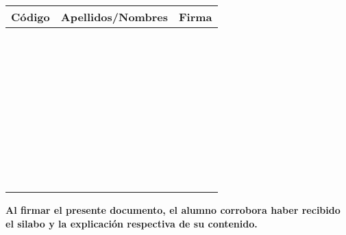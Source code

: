 \documentclass[final]{article}
\begin{document}
\begin{center}
\begin{tabularx}{\textwidth}{|p{2.5cm}|X|p{2.5cm}|}      \hline
{\bf Código} & {\bf Apellidos/Nombres} & {\bf Firma} \\ \hline
 & & \\ \hline
 & & \\ \hline
 & & \\ \hline
 & & \\ \hline
 & & \\ \hline
 & & \\ \hline
 & & \\ \hline
 & & \\ \hline
 & & \\ \hline
 & & \\ \hline
 & & \\ \hline
 & & \\ \hline
 & & \\ \hline
 & & \\ \hline
 & & \\ \hline
 & & \\ \hline
 & & \\ \hline
 & & \\ \hline
 & & \\ \hline
 & & \\ \hline
 & & \\ \hline
 & & \\ \hline
 & & \\ \hline
 & & \\ \hline
 & & \\ \hline
 & & \\ \hline
 & & \\ \hline
 & & \\ \hline
 & & \\ \hline
 & & \\ \hline
 & & \\ \hline
 & & \\ \hline
 & & \\ \hline
 & & \\ \hline
 & & \\ \hline
 & & \\ \hline
 & & \\ \hline
 & & \\ \hline
 & & \\ \hline
 & & \\ \hline
\end{tabularx}
\end{center}

\vspace{0.5cm}
{\bf Al firmar el presente documento, el alumno corrobora haber recibido el silabo y la explicación respectiva de su contenido.}
\end{document}
